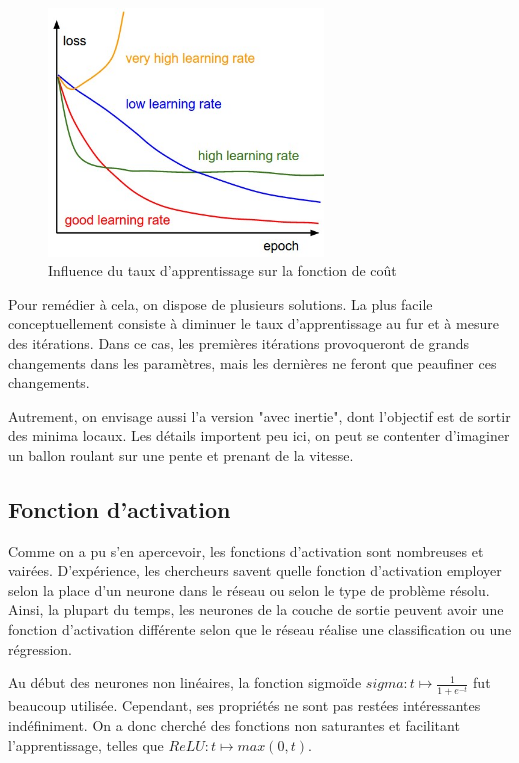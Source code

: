 \begin{figure}[H]
\centering
\includegraphics[width=0.65\textwidth]{img/taux_apprent.png}
\caption{Influence du taux d'apprentissage sur la fonction de coût}
\label{fig:taux_apprent}
\end{figure}

Pour remédier à cela, on dispose de plusieurs solutions. La plus facile conceptuellement consiste à diminuer le taux d'apprentissage au fur et à mesure des itérations. Dans ce cas, les premières itérations provoqueront de grands changements dans les paramètres, mais les dernières ne feront que peaufiner ces changements.

Autrement, on envisage aussi l'a version "avec inertie", dont l'objectif est de sortir des minima locaux. Les détails importent peu ici, on peut se contenter d'imaginer un ballon roulant sur une pente et prenant de la vitesse.

\subsection{Fonction d'activation}
Comme on a pu s'en apercevoir, les fonctions d'activation sont nombreuses et vairées. D'expérience, les chercheurs savent quelle fonction d'activation employer selon la place d'un neurone dans le réseau ou selon le type de problème résolu. Ainsi, la plupart du temps, les neurones de la couche de sortie peuvent avoir une fonction d'activation différente selon que le réseau réalise une classification ou une régression.

Au début des neurones non linéaires, la fonction sigmoïde \(sigma : t \mapsto \frac{1}{1 + e^{-t}}\) fut beaucoup utilisée. Cependant, ses propriétés ne sont pas restées intéressantes indéfiniment. On a donc cherché des fonctions non saturantes et facilitant l'apprentissage, telles que \(\mathit{ReLU} : t \mapsto max(0, t)\).

